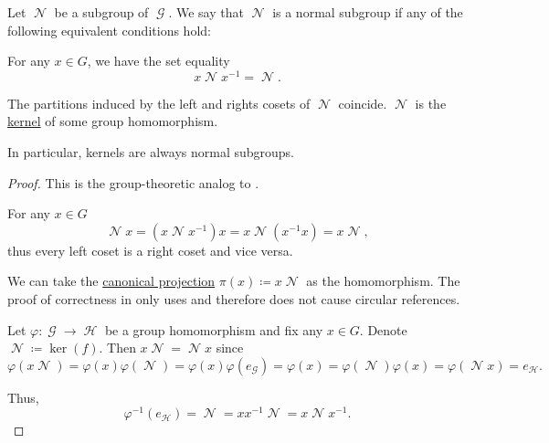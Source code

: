 \begin{definition}\label{def:normal_subgroup}
  Let \( \mscrN \) be a subgroup of \( \mscrG \). We say that \( \mscrN \) is a normal subgroup if any of the following equivalent conditions hold:
  \begin{thmenum}
     For any \( x \in G \), we have the set equality
    \begin{equation}\label{eq:def:normal_subgroup/direct}
      x \mscrN x^{-1} = \mscrN.
    \end{equation}

     The partitions induced by the left and rights cosets of \( \mscrN \) coincide.
     \( \mscrN \) is the \hyperref[def:unital_magma_kernel]{kernel} of some group homomorphism.
  \end{thmenum}

  In particular, kernels are always normal subgroups.
\end{definition}
\begin{proof}
  This is the group-theoretic analog to .

   For any \( x \in G \)
  \begin{equation*}
    \mscrN x = (x \mscrN x^{-1})x = x \mscrN(x^{-1}x) = x \mscrN,
  \end{equation*}
  thus every left coset is a right coset and vice versa.

   We can take the \hyperref[def:quotient_group]{canonical projection} \( \pi(x) \coloneqq x \mscrN \) as the homomorphism. The proof of correctness in  only uses  and therefore does not cause circular references.

   Let \( \varphi: \mscrG \to \mscrH \) be a group homomorphism and fix any \( x \in G \). Denote \( \mscrN \coloneqq \ker(f) \). Then \( x \mscrN = \mscrN x \) since
  \begin{equation*}
    \varphi(x \mscrN)
    =
    \varphi(x) \varphi(\mscrN)
    =
    \varphi(x) \varphi(e_{\mscrG})
    =
    \varphi(x)
    =
    \varphi(\mscrN) \varphi(x)
    =
    \varphi(\mscrN x)
    =
    e_{\mscrH}.
  \end{equation*}

  Thus,
  \begin{equation*}
    \varphi^{-1}(e_{\mscrH}) = \mscrN = xx^{-1}\mscrN = x \mscrN x^{-1}.
  \end{equation*}
\end{proof}

